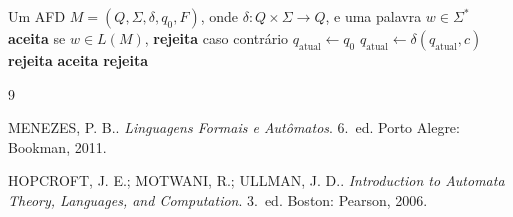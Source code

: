 \documentclass[12pt, a4paper]{article}
\theoremstyle{definition}
\theoremstyle{plain}
\theoremstyle{remark}
\begin{document}
\begin{algorithm}[H]
  \caption{Simulação de um AFD com $\delta(\cdot, \cdot)$ parcial}
  \label{alg:afdCompleto}
  \begin{algorithmic}[1]
    \Require Um AFD $M = (Q, \Sigma, \delta, q_0, F)$,
             onde $\delta : Q \times \Sigma \to Q$,
             e uma palavra $w \in \Sigma^*$
    \Ensure  \textbf{aceita} se $w \in L(M)$, \textbf{rejeita} caso contrário
    \State $q_{\text{atual}} \gets q_0$
        \State $q_{\text{atual}} \gets \delta(q_{\text{atual}}, c)$
      \Else
        \State \Return \textbf{rejeita}
      \EndIf
    \EndFor
      \State \Return \textbf{aceita}
    \Else
      \State \Return \textbf{rejeita}
    \EndIf
  \end{algorithmic}
\end{algorithm}

\newpage
\begin{thebibliography}{9}

MENEZES, P. B.\@.
\textit{Linguagens Formais e Autômatos}.
6.~ed. Porto Alegre: Bookman, 2011.

HOPCROFT, J. E.; MOTWANI, R.; ULLMAN, J. D.\@.
\textit{Introduction to Automata Theory, Languages, and Computation}.
3.~ed. Boston: Pearson, 2006.

\end{thebibliography}
\end{document}
